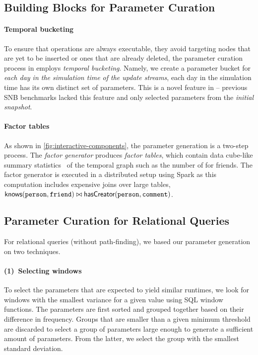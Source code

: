 \subsection{Building Blocks for Parameter Curation}

\paragraph{Temporal bucketing}
\label{sec:temporal-bucketing}
%
To ensure that operations are always executable, \ie they avoid targeting nodes that are yet to be inserted or ones that are already deleted, the parameter curation process in \interactivevtwo employs \emph{temporal bucketing}.
Namely, we create a parameter bucket for \emph{each day in the simulation time of the update streams},
\ie each day in the simulation time has its own distinct set of parameters.
This is a novel feature in \interactivevtwo{} -- previous SNB benchmarks lacked this feature and only selected parameters from the \emph{initial snapshot}.

\paragraph{Factor tables}
As shown in \autoref{fig:interactive-components}, the parameter generation is a two-step process.
The \emph{factor generator} produces \emph{factor tables}, which contain data cube-like summary statistics~\cite{DBLP:journals/datamine/GrayCBLRVPP97} of the temporal graph such as the number of \Messages for friends.
The factor generator is executed in a distributed setup using Spark as this computation includes expensive joins over large tables,
\eg $\textsf{knows}(\texttt{person}, \texttt{friend}) \bowtie \textsf{hasCreator}(\texttt{person}, \texttt{comment})$.


\subsection{Parameter Curation for Relational Queries}

For relational queries (without path-finding), we based our parameter generation on two techniques.

\paragraph{(1)~Selecting windows}
%
To select the parameters that are expected to yield similar runtimes, we look for windows with the smallest variance for a given value using SQL window functions.
The parameters are first sorted and grouped together based on their difference in frequency.
Groups that are smaller than a given minimum threshold are discarded to select a group of
parameters large enough to generate a sufficient amount of parameters.
From the latter, we select
the group with the smallest standard deviation.

